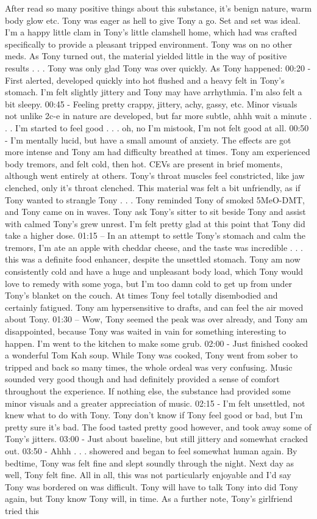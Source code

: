 \documentclass[12pt]{book}
\begin{document}
After read so many positive things about this substance, it's benign nature, warm body glow etc. Tony was eager as hell to give Tony a go. Set and set was ideal. I'm a happy little clam in Tony's little clamshell home, which had was crafted specifically to provide a pleasant tripped environment. Tony was on no other meds. As Tony turned out, the material yielded little in the way of positive results  . . .  Tony was only glad Tony was over quickly. As Tony happened: 00:20 - First alerted, developed quickly into hot flushed and a heavy felt in Tony's stomach. I'm felt slightly jittery and Tony may have arrhythmia. I'm also felt a bit sleepy. 00:45 - Feeling pretty crappy, jittery, achy, gassy, etc. Minor visuals not unlike 2c-e in nature are developed, but far more subtle, ahhh wait a minute  . . .  I'm started to feel good  . . .  oh, no I'm mistook, I'm not felt good at all. 00:50 - I'm mentally lucid, but have a small amount of anxiety. The effects are got more intense and Tony am had difficulty breathed at times. Tony am experienced body tremors, and felt cold, then hot. CEVs are present in brief moments, although went entirely at others. Tony's throat muscles feel constricted, like jaw clenched, only it's throat clenched. This material was felt a bit unfriendly, as if Tony wanted to strangle Tony  . . .  Tony reminded Tony of smoked 5MeO-DMT, and Tony came on in waves. Tony ask Tony's sitter to sit beside Tony and assist with calmed Tony's grew unrest. I'm felt pretty glad at this point that Tony did take a higher dose. 01:15 -- In an attempt to settle Tony's stomach and calm the tremors, I'm ate an apple with cheddar cheese, and the taste was incredible  . . .  this was a definite food enhancer, despite the unsettled stomach. Tony am now consistently cold and have a huge and unpleasant body load, which Tony would love to remedy with some yoga, but I'm too damn cold to get up from under Tony's blanket on the couch. At times Tony feel totally disembodied and certainly fatigued. Tony am hypersensitive to drafts, and can feel the air moved about Tony. 01:30 -- Wow, Tony seemed the peak was over already, and Tony am disappointed, because Tony was waited in vain for something interesting to happen. I'm went to the kitchen to make some grub. 02:00 - Just finished cooked a wonderful Tom Kah soup. While Tony was cooked, Tony went from sober to tripped and back so many times, the whole ordeal was very confusing. Music sounded very good though and had definitely provided a sense of comfort throughout the experience. If nothing else, the substance had provided some minor visuals and a greater appreciation of music. 02:15 - I'm felt unsettled, not knew what to do with Tony. Tony don't know if Tony feel good or bad, but I'm pretty sure it's bad. The food tasted pretty good however, and took away some of Tony's jitters. 03:00 - Just about baseline, but still jittery and somewhat cracked out. 03:50 - Ahhh  . . .  showered and began to feel somewhat human again. By bedtime, Tony was felt fine and slept soundly through the night. Next day as well, Tony felt fine. All in all, this was not particularly enjoyable and I'd say Tony was bordered on was difficult. Tony will have to talk Tony into did Tony again, but Tony know Tony will, in time. As a further note, Tony's girlfriend tried this 
\end{document}
